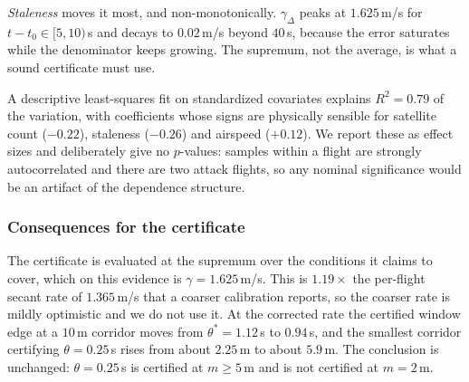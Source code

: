 \emph{Staleness} moves it most, and non-monotonically. $\gamma_{\Delta}$ peaks
at $1.625$\,m/s for $t-t_0\in[5,10)$\,s and decays to $0.02$\,m/s beyond
$40$\,s, because the error saturates while the denominator keeps growing. The
supremum, not the average, is what a sound certificate must use.

A descriptive least-squares fit on standardized covariates explains
$R^{2}=0.79$ of the variation, with coefficients whose signs are physically
sensible for satellite count ($-0.22$), staleness ($-0.26$) and airspeed
($+0.12$). We report these as effect sizes and deliberately give no $p$-values:
samples within a flight are strongly autocorrelated and there are two attack
flights, so any nominal significance would be an artifact of the dependence
structure.

\begin{table}[t]
\centering
\caption{Per-flight rates $\gamma$, the coarse calibration a single scalar per
flight yields. The $2.6\times$ spread across attack type is visible here; the
finer structure needs Table~\ref{tab:gammacamp}. Generated by
.}
\label{tab:gamma}
\small
\renewcommand{\arraystretch}{1.05}

\end{table}

\begin{table}[t]
\centering
\caption{Per-sample distribution of the baseline-corrected rate
$\gamma_{\Delta}$, binned by factor, over $674$ post-onset samples. Counts are
shown because coverage is uneven: airspeed bins above $1$\,m/s are sparse, since
these are hover flights. Generated by .}
\label{tab:gammacamp}
\scriptsize
\renewcommand{\arraystretch}{1.02}

\end{table}

\subsubsection{Consequences for the certificate}
The certificate is evaluated at the supremum over the conditions it claims to
cover, which on this evidence is $\gamma=1.625$\,m/s. This is
$1.19\times$ the per-flight secant rate of $1.365$\,m/s that a coarser
calibration reports, so the coarser rate is mildly optimistic and we do not use
it. At the corrected rate the certified window edge at a $10$\,m corridor moves
from $\theta^{*}=1.12$\,s to $0.94$\,s, and the smallest corridor certifying
$\theta=0.25$\,s rises from about $2.25$\,m to about $5.9$\,m. The conclusion is
unchanged: $\theta=0.25$\,s is certified at $m\ge5$\,m and is not certified at
$m=2$\,m.

